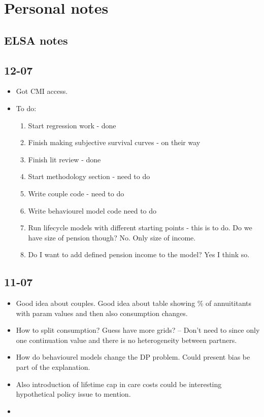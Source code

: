 \documentclass[12pt]{article}
\begin{document}
\section{Personal notes}

\subsection{ELSA notes}

\subsection{\textbf{12-07}}
\begin{itemize}

    \item Got CMI access.

    \item To do: \begin{enumerate}
              \item Start regression work - done
              \item Finish making subjective survival curves - on their way
              \item Finish lit review - done
              \item Start methodology section - need to do
              \item Write couple code - need to do
              \item Write behaviourel model code need to do
              \item Run lifecycle models with different starting points - this is to do.
                    Do we have size of pension though? No. Only size of income.
                    
                    \item Do I want to add defined pension income to the model? Yes I think so. 
          \end{enumerate}
\end{itemize}

\subsection{\textbf{11-07}}
\begin{itemize}
    \item Good idea about couples. Good idea about table showing \% of annuititants
          with param values and then also consumption changes.

    \item How to split consumption? Guess have more grids? -- Don't need to since only one
          continuation value and there is no heterogeneity between partners.
    \item How do behaviourel models change the DP problem. Could present bias
          be part of the explanation.

    \item Also introduction of lifetime cap in care costs could be interesting
          hypothetical policy issue to mention.

    \item
\end{itemize}
\end{document}
